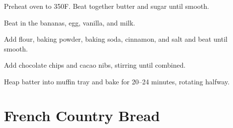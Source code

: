 \documentclass[oneside]{book}  %
\def\thisrecipe{}  %
\newcommand{\recipe}[1]{\section{#1}\def\thisrecipe{: #1}} %
\newcommand{\degF}{\textdegree F\xspace}
\begin{document}
\begin{directions}
  \item Preheat oven to 350\degF. Beat together butter and sugar until smooth.

  \item Beat in the bananas, egg, vanilla, and milk.

  \item Add flour, baking powder, baking soda, cinnamon, and salt and beat until
    smooth.

  \item Add chocolate chips and cacao nibs, stirring until combined.

  \item Heap batter into muffin tray and bake for 20--24 minutes, rotating
    halfway.
\end{directions}
\recipe{French Country Bread} \label{recipe:french_country_bread} %
\end{document}
